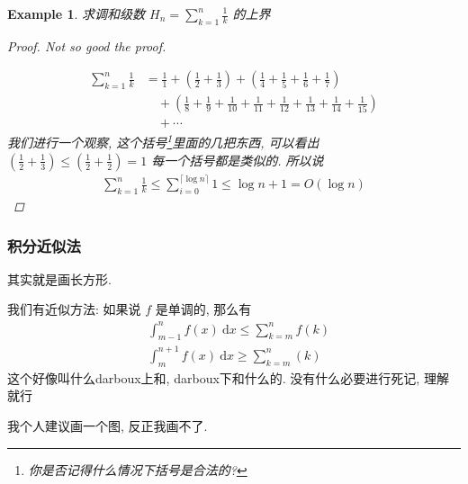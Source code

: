 \documentclass[a4paper, 10pt]{ctexart} %
\newtheorem{example}{Example}
\begin{document}
\begin{example}
    求调和级数 $H_{n} = \sum_{k=1} ^{n} \frac{1}{k}$ 的上界
    \begin{proof}
    Not so good the proof.

    \begin{align*}
        \sum_{k=1} ^{n} \frac{1}{k} & = \frac{1}{1} + \left( \frac{1}{2} + \frac{1}{3} \right) + (\frac{1}{4} + \frac{1}{5} + \frac{1}{6} + \frac{1}{7} )  \\
        &\quad +\left( \frac{1}{8}  +\frac{1}{9} + \frac{1}{10} + \frac{1}{11} + \frac{1}{12} + \frac{1}{13} + \frac{1}{14} + \frac{1}{15}\right) \\
        &\quad + \cdots 
    \end{align*}
    我们进行一个观察, 这个括号\footnote{你是否记得什么情况下括号是合法的?}里面的几把东西, 可以看出 
    $\displaystyle  \left(\frac{1}{2} + \frac{1}{3}\right) \le \left( \frac{1}{2} + \frac{1}{2} \right)  =1$
    每一个括号都是类似的. 所以说 
    \begin{align*}
        \sum_{k=1} ^{n} \frac{1}{k} \le \sum_{i = 0}  ^{\lceil\log n\rceil} 1 \le \log n + 1 = O \left(\log  n  \right)
    \end{align*} 
    \end{proof}
\end{example}

\subsubsection{积分近似法}
其实就是画长方形. 

我们有近似方法: 如果说 $f$ 是单调的, 那么有
\begin{align*}
&\int ^{n} _{m-1} f\left(x\right) \ \mathrm{d} x \le \sum_{k=m} ^{n} f\left(k\right)\\
&\int ^{n + 1} _{m} f\left(x\right)\ \mathrm{d} x \ge \sum_{k = m}  ^{n} \left(k\right)
\end{align*}
这个好像叫什么darboux上和, darboux下和什么的. 没有什么必要进行死记, 理解就行

我个人建议画一个图, 反正我画不了.
\end{document}
